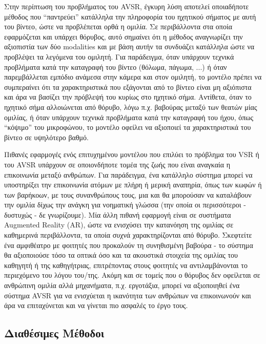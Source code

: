 Στην περίπτωση του προβλήματος του AVSR, έγκυρη λύση αποτελεί οποιαδήποτε μέθοδος που ``παντρεύει'' κατάλληλα την πληροφορία του ηχητικού σήματος με αυτή του βίντεο, ώστε να προβλέπεται ορθά η ομιλία. Σε περιβάλλοντα στα οποία εφαρμόζεται και υπάρχει θόρυβος, αυτό σημαίνει ότι η μέθοδος αναγνωρίζει την αξιοπιστία των δύο modalities και με βάση αυτήν τα συνδυάζει κατάλληλα ώστε να προβλέψει τα λεγόμενα του ομιλητή. Για παράδειγμα, όταν υπάρχουν τεχνικά προβλήματα κατά την καταγραφή του βίντεο (θόλωμα, πάγωμα, ...) ή όταν παρεμβάλλεται εμπόδιο ανάμεσα στην κάμερα και στον ομιλητή, το μοντέλο πρέπει να συμπεραίνει ότι τα χαρακτηριστικά που εξάγονται από το βίντεο είναι μη αξιόπιστα και άρα να βασίζει την πρόβλεψή του κυρίως στο ηχητικό σήμα. Αντίθετα, όταν το ηχητικό σήμα αλλοιώνεται από θόρυβο, λόγω π.χ. βαβούρας μεταξύ των θεατών μίας ομιλίας, ή όταν υπάρχουν τεχνικά προβλήματα κατά την καταγραφή του ήχου, όπως ``κόψιμο'' του μικροφώνου, το μοντέλο οφείλει να αξιοποιεί τα χαρακτηριστικά του βίντεο σε υψηλότερο βαθμό.

Πιθανές εφαρμογές ενός επιτυχημένου μοντέλου που επιλύει το πρόβλημα του VSR ή του AVSR υπάρχουν σε οποιονδήποτε τομέα της ζωής που είναι αναγκαία η επικοινωνία μεταξύ ανθρώπων. Για παράδειγμα, ένα κατάλληλο σύστημα μπορεί να υποστηρίξει την επικοινωνία ατόμων με πλήρη ή μερική αναπηρία, όπως των κωφών ή των βαρήκοων, με τους συνανθρώπους τους, μια και θα μπορούσαν να καταλάβουν την ομιλία δίχως την ανάγκη για νοηματική γλώσσα (την οποία οι περισσότεροι - δυστυχώς - δε γνωρίζουμε). Μία άλλη πιθανή εφαρμογή είναι σε συστήματα Augmented Reality (AR), ώστε να ενισχύσει την κατανόηση της ομιλίας σε καθημερινά περιβάλλοντα, τα οποία συχνά χαρακτηρίζονται από θόρυβο. Σκεφτείτε ένα αμφιθέατρο με φοιτητές που προκαλούν τη συνηθισμένη βαβούρα - το σύστημα θα αξιοποιούσε τόσο τα οπτικά όσο και τα ακουστικά στοιχεία της ομιλίας του καθηγητή ή της καθηγήτριας, επιτρέποντας στους φοιτητές να αντιλαμβάνονται το περιεχόμενο του λόγου του/της. Ακόμη και σε τομείς που ο θόρυβος δεν οφείλεται σε ανθρώπινη ομιλία αλλά μηχανήματα, π.χ. εργοτάξια, μπορεί να αξιοποιηθεί ένα σύστημα AVSR για να ενισχύεται η ικανότητα των ανθρώπων να επικοινωνούν και άρα να επιταχύνεται και να γίνεται πιο ασφαλές το έργο τους.

\subsection{Διαθέσιμες Μέθοδοι}


